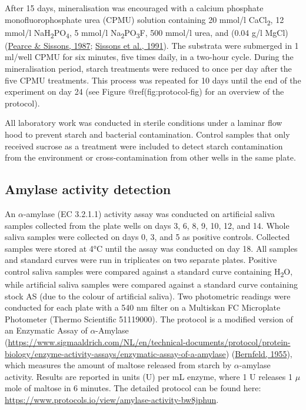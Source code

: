 \documentclass[
  letterpaper,
]{book}
\begin{document}
After 15 days, mineralisation was encouraged with a calcium phosphate
monofluorophosphate urea (CPMU) solution containing 20 mmol/l
CaCl\textsubscript{2}, 12 mmol/l
NaH\textsubscript{2}PO\textsubscript{4}, 5 mmol/l
Na\textsubscript{2}PO\textsubscript{3}F, 500 mmol/l urea, and (0.04 g/l
MgCl) (\protect\hyperlink{ref-pearceConcomitantDeposition1987}{Pearce \&
Sissons, 1987};
\protect\hyperlink{ref-sissonsMultistationPlaque1991}{Sissons et al.,
1991}). The substrata were submerged in 1 ml/well CPMU for six minutes,
five times daily, in a two-hour cycle. During the mineralisation period,
starch treatments were reduced to once per day after the five CPMU
treatments. This process was repeated for 10 days until the end of the
experiment on day 24 (see Figure @ref(fig:protocol-fig) for an overview
of the protocol).

All laboratory work was conducted in sterile conditions under a laminar
flow hood to prevent starch and bacterial contamination. Control samples
that only received sucrose as a treatment were included to detect starch
contamination from the environment or cross-contamination from other
wells in the same plate.

\hypertarget{amylase-activity-detection}{%
\subsection{Amylase activity
detection}\label{amylase-activity-detection}}

An \(\alpha\)-amylase (EC 3.2.1.1) activity assay was conducted on
artificial saliva samples collected from the plate wells on days 3, 6,
8, 9, 10, 12, and 14. Whole saliva samples were collected on days 0, 3,
and 5 as positive controls. Collected samples were stored at 4°C until
the assay was conducted on day 18. All samples and standard curves were
run in triplicates on two separate plates. Positive control saliva
samples were compared against a standard curve containing
H\textsubscript{2}O, while artificial saliva samples were compared
against a standard curve containing stock AS (due to the colour of
artificial saliva). Two photometric readings were conducted for each
plate with a 540 nm filter on a Multiskan FC Microplate Photometer
(Thermo Scientific 51119000). The protocol is a modified version of an
Enzymatic Assay of \(\alpha\)-Amylase
(\url{https://www.sigmaaldrich.com/NL/en/technical-documents/protocol/protein-biology/enzyme-activity-assays/enzymatic-assay-of-a-amylase})
(\protect\hyperlink{ref-bernfeldAmylase1955}{Bernfeld, 1955}), which
measures the amount of maltose released from starch by
\(\alpha\)-amylase activity. Results are reported in units (U) per mL
enzyme, where 1 U releases 1 \(\mu\)mole of maltose in 6 minutes. The
detailed protocol can be found here:
\url{https://www.protocols.io/view/amylase-activity-bw8jphun}.
\end{document}
